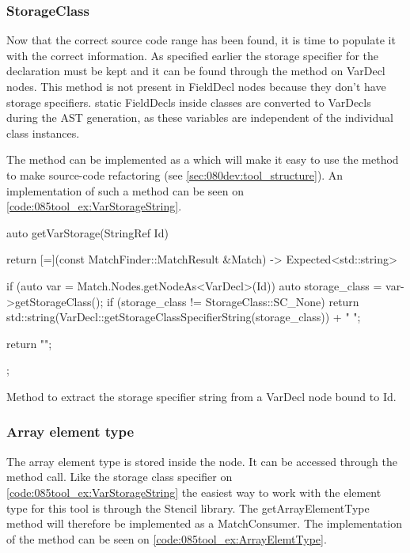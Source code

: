 \subsubsection*{StorageClass}
Now that the correct source code range has been found, it is time to populate it with the correct information. As specified earlier the storage specifier for the declaration must be kept and it can be found through the  method on VarDecl nodes. This method is not present in FieldDecl nodes because they don't have storage specifiers. static FieldDecls inside classes are converted to VarDecls during the AST generation, as these variables are independent of the individual class instances. 

The  method can be implemented as a  which will make it easy to use the method to make source-code refactoring (see \cref{sec:080dev:tool_structure}). An implementation of such a method can be seen on \cref{code:085tool_ex:VarStorageString}.

\begin{listing}[H]
    \begin{cppcode}
auto getVarStorage(StringRef Id) {
    return [=](const MatchFinder::MatchResult &Match) -> Expected<std::string> {
        if (auto var = Match.Nodes.getNodeAs<VarDecl>(Id)) {
            auto storage_class = var->getStorageClass();
            if (storage_class != StorageClass::SC_None) {
               return std::string(VarDecl::getStorageClassSpecifierString(storage_class)) + " ";
            }
        }

        return "";
    };
}
    \end{cppcode}
    \caption{Method to extract the storage specifier string from a VarDecl node bound to Id.}
    \label{code:085tool_ex:VarStorageString}
\end{listing}

\subsubsection*{Array element type}

The array element type is stored inside the  node. It can be accessed through the  method call. Like the storage class specifier on \cref{code:085tool_ex:VarStorageString} the easiest way to work with the element type for this tool is through the Stencil library. The getArrayElementType method will therefore be implemented as a MatchConsumer. The implementation of the method can be seen on \cref{code:085tool_ex:ArrayElemtType}. 

